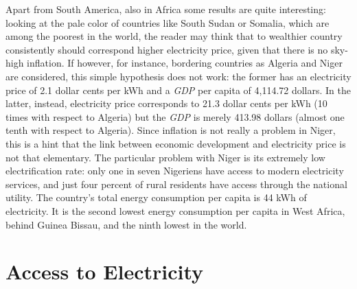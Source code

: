 \documentclass[a4paper,12pt]{book}
\begin{document}
Apart from South America, also in Africa some results are quite interesting: looking at the pale color of countries like South Sudan or Somalia, which are among the poorest in the world, the reader may think that to wealthier country consistently should correspond higher electricity price, given that there is no sky-high inflation. If however, for instance, bordering countries as Algeria and Niger are considered, this simple hypothesis does not work: the former has an electricity price of 2.1 dollar cents per kWh and a \textit{GDP} per capita of 4,114.72 dollars. In the latter, instead, electricity price corresponds to 21.3 dollar cents per kWh (10 times with respect to Algeria) but the \textit{GDP} is merely 413.98 dollars (almost one tenth with respect to Algeria). Since inflation is not really a problem in Niger, this is a hint that the link between economic development and electricity price is not that elementary. The particular problem with Niger is its extremely low electrification rate: only one in seven Nigeriens have access to modern electricity services, and just four percent of rural residents have access through the national utility. The country's total energy consumption per capita is 44 kWh of electricity. It is the second lowest energy consumption per capita in West Africa, behind Guinea Bissau, and the ninth lowest in the world.

\section{Access to Electricity}
\end{document}
